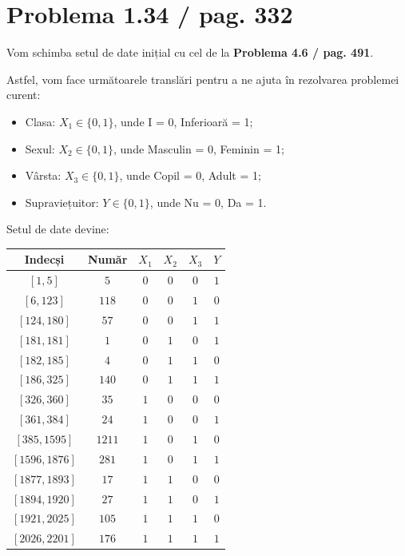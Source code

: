 \documentclass{article}
\begin{document}
\section*{Problema 1.34 / pag. 332}

Vom schimba setul de date inițial cu cel de la \textbf{Problema 4.6 / pag. 491}.

\noindent Astfel, vom face următoarele translări pentru a ne ajuta în rezolvarea problemei curent:
\begin{itemize}
    \item Clasa: \( X_1 \in \{0, 1\} \), unde I = 0, Inferioară = 1;
    \item Sexul: \( X_2 \in \{0, 1\} \), unde Masculin = 0, Feminin = 1;
    \item Vârsta: \( X_3 \in \{0, 1\} \), unde Copil = 0, Adult = 1;
    \item Supraviețuitor: \( Y \in \{0, 1\} \), unde Nu = 0, Da = 1.
\end{itemize}

Setul de date devine:

\begin{center}
\begin{tabular}{|c|c|c|c|c|c|}
    \hline
    Indecși & Număr & \( X_1 \) & \( X_2 \) & \( X_3 \) & \( Y \) \\ \hline
    \( [1, 5] \) & \( 5 \) & \( 0 \) & \( 0 \) & \( 0 \) & \( 1 \) \\ \hline
    \( [6, 123] \) & \( 118 \) & \( 0 \) & \( 0 \) & \( 1 \) & \( 0 \) \\ \hline
    \( [124, 180] \) & \( 57 \) & \( 0 \) & \( 0 \) & \( 1 \) & \( 1 \) \\ \hline
    \( [181, 181] \) & \( 1 \) & \( 0 \) & \( 1 \) & \( 0 \) & \( 1 \) \\ \hline
    \( [182, 185] \) & \( 4 \) & \( 0 \) & \( 1 \) & \( 1 \) & \( 0 \) \\ \hline
    \( [186, 325] \) & \( 140 \) & \( 0 \) & \( 1 \) & \( 1 \) & \( 1 \) \\ \hline
    \( [326, 360] \) & \( 35 \) & \( 1 \) & \( 0 \) & \( 0 \) & \( 0 \) \\ \hline
    \( [361, 384] \) & \( 24 \) & \( 1 \) & \( 0 \) & \( 0 \) & \( 1 \) \\ \hline
    \( [385, 1595] \) & \( 1211 \) & \( 1 \) & \( 0 \) & \( 1 \) & \( 0 \) \\ \hline
    \( [1596, 1876] \) & \( 281 \) & \( 1 \) & \( 0 \) & \( 1 \) & \( 1 \) \\ \hline
    \( [1877, 1893] \) & \( 17 \) & \( 1 \) & \( 1 \) & \( 0 \) & \( 0 \) \\ \hline
    \( [1894, 1920] \) & \( 27 \) & \( 1 \) & \( 1 \) & \( 0 \) & \( 1 \) \\ \hline
    \( [1921, 2025] \) & \( 105 \) & \( 1 \) & \( 1 \) & \( 1 \) & \( 0 \) \\ \hline
    \( [2026, 2201] \) & \( 176 \) & \( 1 \) & \( 1 \) & \( 1 \) & \( 1 \) \\ \hline
\end{tabular} \\
\end{center}
\end{document}
